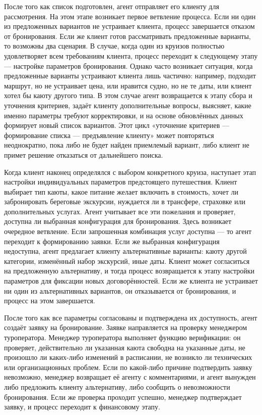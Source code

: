 \documentclass[11pt,a4paper,final]{article}
\begin{document}
После того как список подготовлен, агент отправляет его клиенту для рассмотрения. На этом этапе возникает первое ветвление процесса. Если ни один из предложенных вариантов не устраивает клиента, процесс завершается отказом от бронирования. Если же клиент готов рассматривать предложенные варианты, то возможны два сценария. В случае, когда один из круизов полностью удовлетворяет всем требованиям клиента, процесс переходит к следующему этапу — настройке параметров бронирования. Однако часто возникает ситуация, когда предложенные варианты устраивают клиента лишь частично: например, подходит маршрут, но не устраивает цена, или нравится судно, но не те даты, или клиент хотел бы каюту другого типа. В этом случае агент возвращается к этапу сбора и уточнения критериев, задаёт клиенту дополнительные вопросы, выясняет, какие именно параметры требуют корректировки, и на основе обновлённых данных формирует новый список вариантов. Этот цикл «уточнение критериев — формирование списка — предъявление клиенту» может повторяться неоднократно, пока либо не будет найден приемлемый вариант, либо клиент не примет решение отказаться от дальнейшего поиска.

Когда клиент наконец определялся с выбором конкретного круиза, наступает этап настройки индивидуальных параметров предстоящего путешествия. Клиент выбирает тип каюты, какое питание желает включить в стоимость, хочет ли забронировать береговые экскурсии, нуждается ли в трансфере, страховке или дополнительных услугах. Агент учитывает все эти пожелания и проверяет, доступна ли выбранная конфигурация для бронирования. Здесь возникает очередное ветвление. Если запрошенная комбинация услуг доступна — то агент переходит к формированию заявки. Если же выбранная конфигурация недоступна, агент предлагает клиенту альтернативные варианты: каюту другой категории, изменённый набор экскурсий, иные даты. Клиент может согласиться на предложенную альтернативу, и тогда процесс возвращается к этапу настройки параметров для фиксации новых договорённостей. Если же клиента не устраивает ни один из альтернативных вариантов, он отказывается от бронирования, и процесс на этом завершается.

После того как все параметры согласованы и подтверждена их доступность, агент создаёт заявку на бронирование. Заявке направляется на проверку менеджером туроператора. Менеджер туроператора выполняет функцию верификации: он проверяет, действительно ли указанная каюта свободна на указанные даты, не произошло ли каких-либо изменений в расписании, не возникло ли технических или организационных проблем. Если по какой-либо причине подтвердить заявку невозможно, менеджер возвращает её агенту с комментариями, и агент вынужден либо предложить клиенту альтернативу, либо сообщить о невозможности бронирования. Если же проверка проходит успешно, менеджер подтверждает заявку, и процесс переходит к финансовому этапу.
\end{document}
